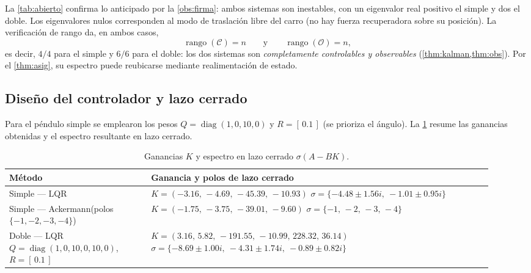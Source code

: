\documentclass[11pt,letterpaper]{article}
\theoremstyle{definition}
\theoremstyle{plain}
\theoremstyle{remark}
\DeclareMathOperator{\rank}{rango}
\newcommand{\calC}{\mathcal{C}}
\newcommand{\calO}{\mathcal{O}}
\begin{document}
La \cref{tab:abierto} confirma lo anticipado por la \cref{obs:firma}:
ambos sistemas son inestables, con un eigenvalor real positivo el simple y
dos el doble. Los eigenvalores nulos corresponden al modo de traslación
libre del carro (no hay fuerza recuperadora sobre su posición). La
verificación de rango da, en ambos casos,
\begin{equation}
  \rank(\calC)=n \qquad\text{y}\qquad \rank(\calO)=n,
\end{equation}
es decir, $4/4$ para el simple y $6/6$ para el doble: los dos sistemas son
\emph{completamente controlables y observables}
(\cref{thm:kalman,thm:obs}). Por el \cref{thm:asig}, su espectro puede
reubicarse mediante realimentación de estado.

\subsection{Diseño del controlador y lazo cerrado}

Para el péndulo simple se emplearon los pesos
$Q=\operatorname{diag}(1,0,10,0)$ y $R=[\,0.1\,]$ (se prioriza el ángulo).
La \cref{tab:K} resume las ganancias obtenidas y el espectro resultante en
lazo cerrado.

\begin{table}[htbp]
  \centering
  \caption{Ganancias $K$ y espectro en lazo cerrado $\sigma(A-BK)$.}
  \label{tab:K}
  \renewcommand{\arraystretch}{1.3}
  \begin{tabular}{@{}p{0.27\linewidth}p{0.65\linewidth}@{}}
    \toprule
    \textbf{Método} & \textbf{Ganancia y polos de lazo cerrado}\\
    \midrule
    Simple — LQR &
      $K=(-3.16,\,-4.69,\,-45.39,\,-10.93)$\newline
      $\sigma=\{-4.48\pm1.56i,\ -1.01\pm0.95i\}$\\
    Simple — Ackermann\newline (polos $\{-1,-2,-3,-4\}$) &
      $K=(-1.75,\,-3.75,\,-39.01,\,-9.60)$\newline
      $\sigma=\{-1,\,-2,\,-3,\,-4\}$\\
    Doble — LQR\newline $Q=\operatorname{diag}(1,0,10,0,10,0)$,\newline $R=[\,0.1\,]$ &
      $K=(3.16,\,5.82,\,-191.55,\,-10.99,\,228.32,\,36.14)$\newline
      $\sigma=\{-8.69\pm1.00i,\ -4.31\pm1.74i,\ -0.89\pm0.82i\}$\\
    \bottomrule
  \end{tabular}
\end{table}
\end{document}
